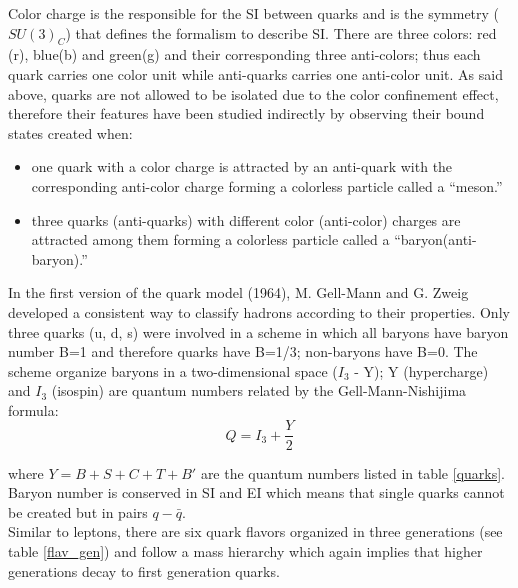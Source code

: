 \noindent Color charge is the responsible for the SI between quarks and is the symmetry ($SU(3)_C$) that defines the formalism to describe SI. There are three colors: red (r), blue(b) and green(g) and their corresponding three anti-colors; thus each quark carries one color unit while anti-quarks carries one anti-color unit. As said above, quarks are not allowed to be isolated due to the color confinement effect, therefore their features have been studied indirectly by observing their bound states created when:

\begin{itemize}
\item one quark with a color charge is attracted by an anti-quark with the corresponding anti-color charge forming a colorless particle called a ``meson.''
\item three quarks (anti-quarks) with different color (anti-color) charges are attracted among them forming a colorless particle called a ``baryon(anti-baryon).''          
\end{itemize}

\noindent In the first version of the quark model (1964), M. Gell-Mann\cite{gellman} and G. Zweig\cite{zweig,zweig2} developed a consistent way to classify hadrons according to their properties. Only three quarks (u, d, s) were involved in a scheme in which all baryons have baryon number B=1 and therefore quarks have B=1/3; non-baryons have B=0. The scheme organize baryons in a two-dimensional space ($I_3$ - Y); Y (hypercharge) and $I_3$ (isospin) are quantum numbers related by the Gell-Mann-Nishijima formula\cite{gell_ni,gell_ni2}:
\begin{equation}
Q=I_3 + \frac{Y}{2}
\label{gmn}
\end{equation}

\noindent where $Y=B+S+C+T+B'$ are the quantum numbers listed in table \ref{quarks}. Baryon number is conserved in SI and EI which means that single quarks cannot be created but in pairs $q-\bar{q}$.\\

\noindent Similar to leptons, there are six quark flavors organized in three generations (see table \ref{flav_gen}) and follow a mass hierarchy which again implies that higher generations decay to first generation quarks.

